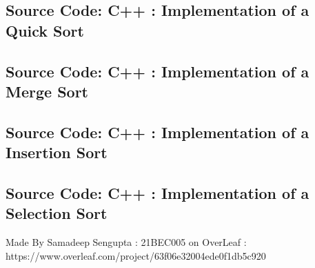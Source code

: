 \documentclass[a4paper]{article}
\begin{document}
\subsection{Source Code: C++ : Implementation of a Quick Sort}


\subsection{Source Code: C++ : Implementation of a Merge Sort}


\subsection{Source Code: C++ : Implementation of a Insertion Sort}


\subsection{Source Code: C++ : Implementation of a Selection Sort}






Made By Samadeep Sengupta : 21BEC005 on OverLeaf : 
https://www.overleaf.com/project/63f06e32004ede0f1db5c920



\pagebreak
\end{document}
